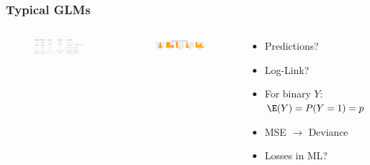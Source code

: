 \begin{frame}
	\frametitle{Typical GLMs}
	\begin{columns}[onlytextwidth]
		\begin{figure}
			\includegraphics[width=1\textwidth]{pics/glm.png}
		\end{figure}
		\begin{figure}
			\includegraphics[width=1\textwidth]{pics/GLM_distributions.pdf}
		\end{figure}
		\begin{footnotesize}
			\begin{itemize}
				\itemsep0em 
				\item Predictions?
				\item Log-Link?
				\item For binary $Y$:
				$\E(Y) = P(Y = 1) = p$
				\item MSE $\rightarrow$ Deviance
				\item Losses in ML?
			\end{itemize}
		\end{footnotesize}
	\end{columns}
\end{frame}

